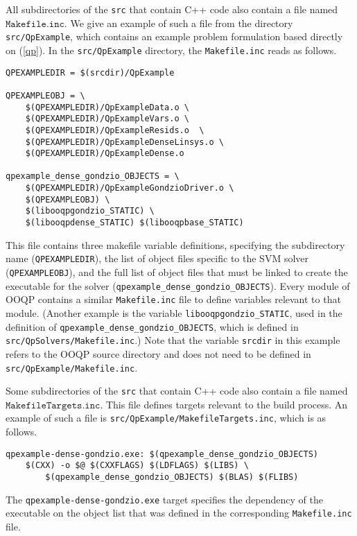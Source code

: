 All subdirectories of the \texttt{src} that contain C++ code also
contain a file named $\mathtt{Makefile.inc}$.  We give an example of
such a file from the directory \verb-src/QpExample-, which contains an
example problem formulation based directly on (\ref{qp}). In the
\texttt{src/QpExample} directory, the \texttt{Makefile.inc} reads
as follows.
\begin{verbatim}
QPEXAMPLEDIR = $(srcdir)/QpExample

QPEXAMPLEOBJ = \
    $(QPEXAMPLEDIR)/QpExampleData.o \
    $(QPEXAMPLEDIR)/QpExampleVars.o \
    $(QPEXAMPLEDIR)/QpExampleResids.o  \
    $(QPEXAMPLEDIR)/QpExampleDenseLinsys.o \
    $(QPEXAMPLEDIR)/QpExampleDense.o 

qpexample_dense_gondzio_OBJECTS = \
    $(QPEXAMPLEDIR)/QpExampleGondzioDriver.o \
    $(QPEXAMPLEOBJ) \
    $(libooqpgondzio_STATIC) \
    $(libooqpdense_STATIC) $(libooqpbase_STATIC)
\end{verbatim}
This file contains three makefile variable definitions, specifying the
subdirectory name (\texttt{QPEXAMPLEDIR}), the list of object files
specific to the SVM solver (\texttt{QPEXAMPLEOBJ}), and the full list
of object files that must be linked to create the executable for the
solver (\texttt{qpexample\_dense\_gondzio\_OBJECTS}).  Every module of
OOQP contains a similar \texttt{Makefile.inc} file to define variables
relevant to that module. (Another example is the variable
\texttt{libooqpgondzio\_STATIC}, used in the definition of
\texttt{qpexample\_dense\_gondzio\_OBJECTS}, which is defined in
\texttt{src/QpSolvers/Makefile.inc}.) Note that the variable
\texttt{srcdir} in this example refers to the OOQP source directory
and does not need to be defined in
\texttt{src/QpExample/Makefile.inc}.

Some subdirectories of the \texttt{src} that contain C++ code
also contain a file named $\mathtt{MakefileTargets.inc}$.  This file
defines targets relevant to the build process. An example of such a
file is \verb-src/QpExample/MakefileTargets.inc-, which is as
follows.
\begin{verbatim}
qpexample-dense-gondzio.exe: $(qpexample_dense_gondzio_OBJECTS)
    $(CXX) -o $@ $(CXXFLAGS) $(LDFLAGS) $(LIBS) \
        $(qpexample_dense_gondzio_OBJECTS) $(BLAS) $(FLIBS)
\end{verbatim}
The \texttt{qpexample-dense-gondzio.exe} target specifies the
dependency of the executable on the object list that was defined
in the corresponding \verb-Makefile.inc- file.


